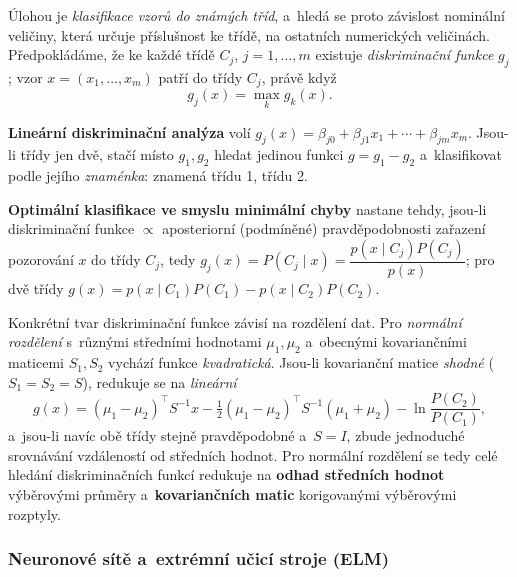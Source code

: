 \documentclass[11pt,a4paper]{article}
\theoremstyle{definition}
\begin{document}
\begin{defbox}
Úlohou je \emph{klasifikace vzorů do známých tříd}, a~hledá se proto závislost nominální
veličiny, která určuje příslušnost ke třídě, na ostatních numerických veličinách.
Předpokládáme, že ke každé třídě $C_j$, $j=1,\dots,m$ existuje \emph{diskriminační funkce}
$g_j$; vzor $x=(x_1,\dots,x_m)$ patří do třídy $C_j$, právě když
\[ g_j(x)=\max_{k} g_k(x). \]

\textbf{Lineární diskriminační analýza} volí
$g_j(x)=\beta_{j0}+\beta_{j1}x_1+\cdots+\beta_{jm}x_m$. Jsou-li třídy jen dvě, stačí místo
$g_1,g_2$ hledat jedinou funkci $g=g_1-g_2$ a~klasifikovat podle jejího \emph{znaménka}:
\uv{$+$} znamená třídu 1, \uv{$-$} třídu 2.

\textbf{Optimální klasifikace ve smyslu minimální chyby} nastane tehdy, jsou-li diskriminační
funkce $\propto$ aposteriorní (podmíněné) pravděpodobnosti zařazení pozorování $x$ do
třídy $C_j$, tedy $g_j(x)=P(C_j\mid x)=\dfrac{p(x\mid C_j)P(C_j)}{p(x)}$; pro dvě třídy
$g(x)=p(x\mid C_1)P(C_1)-p(x\mid C_2)P(C_2)$.
\end{defbox}

Konkrétní tvar diskriminační funkce závisí na rozdělení dat. Pro \emph{normální rozdělení}
s~různými středními hodnotami $\mu_1,\mu_2$ a~obecnými kovariančními maticemi $S_1,S_2$
vychází funkce \emph{kvadratická}. Jsou-li kovarianční matice \emph{shodné}
($S_1=S_2=S$), redukuje se na \emph{lineární}
\[ g(x)=(\mu_1-\mu_2)^{\!\top}S^{-1}x-\tfrac12(\mu_1-\mu_2)^{\!\top}S^{-1}(\mu_1+\mu_2)
   -\ln\frac{P(C_2)}{P(C_1)}, \]
a~jsou-li navíc obě třídy stejně pravděpodobné a~$S=I$, zbude jednoduché srovnávání
vzdáleností od středních hodnot. Pro normální rozdělení se tedy celé hledání diskriminačních
funkcí redukuje na \textbf{odhad středních hodnot} výběrovými průměry a~\textbf{kovariančních
matic} korigovanými výběrovými rozptyly.

\subsubsection{Neuronové sítě a~extrémní učicí stroje (ELM)}
\end{document}
